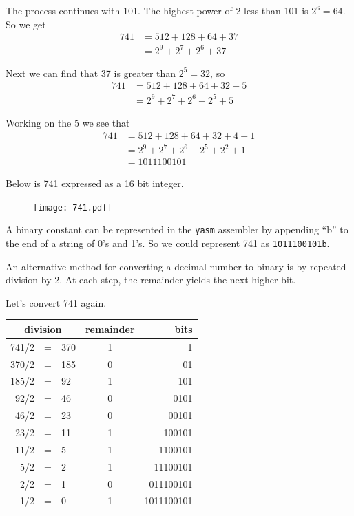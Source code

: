 \documentclass[11pt,b5paper]{book}
\begin{document}
The process continues with 101.
The highest power of 2 less than 101 is $2^6 = 64$.
So we get
\begin{align*}
741 &= 512 + 128 + 64 + 37 \\
    &= 2^9 + 2^7 + 2^6 + 37
\end{align*}

Next we can find that 37 is greater than $2^5 = 32$, so
\begin{align*}
741 &= 512 + 128 + 64 + 32 + 5 \\
    &= 2^9 + 2^7 +2^6 + 2^5 + 5
\end{align*}

Working on the 5 we see that
\begin{align*}
741 &= 512 + 128 + 64 + 32 + 4 + 1 \\
    &= 2^9 + 2^7 +2^6 + 2^5 + 2^2 + 1 \\
    &= 1011100101
\end{align*}

Below is 741 expressed as a 16 bit integer.
\begin{figure}[h!]
\centering\texttt{[image: 741.pdf]}
\end{figure}

A binary constant can be represented in the {\tt yasm} assembler by appending 
``b'' to the end of a string of 0's and 1's.
So we could represent 741 as {\tt 1011100101b}.

An alternative method for converting a decimal number to binary is by repeated division 
by 2.
At each step, the remainder yields the next higher bit.

Let's convert 741 again.  

\begin{center}
\begin{tabular}{rclcr}
\multicolumn{3}{c}{division} & remainder & bits \\
\hline
741/2 &=& 370 & 1 & 1 \\
370/2 &=& 185 & 0 & 01 \\
185/2 &=& 92  & 1 & 101 \\
92/2  &=& 46  & 0 & 0101 \\
46/2  &=& 23  & 0 & 00101 \\
23/2  &=& 11  & 1 & 100101 \\
11/2  &=& 5   & 1 & 1100101 \\
5/2   &=& 2   & 1 & 11100101 \\
2/2   &=& 1   & 0 & 011100101 \\
1/2   &=& 0   & 1 & 1011100101 \\
\end{tabular}
\end{center}
\end{document}
